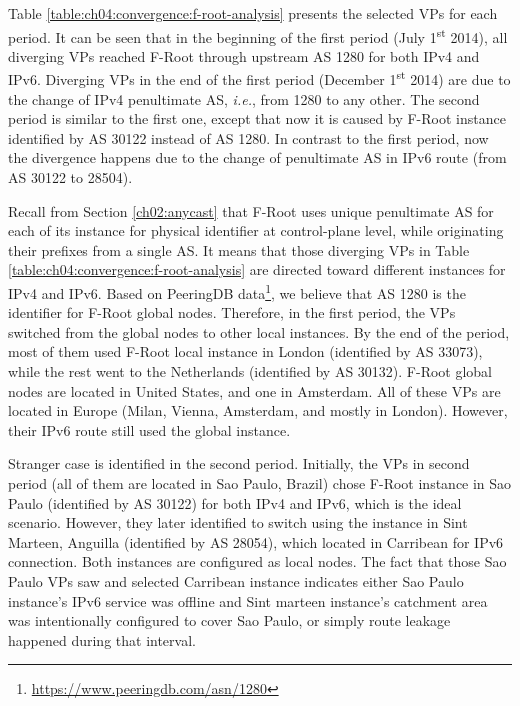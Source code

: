 Table \ref{table:ch04:convergence:f-root-analysis} presents the selected VPs for each period. It can be seen that in the beginning of the first period (July 1\textsuperscript{st} 2014), all diverging VPs reached F-Root through upstream AS 1280 for both IPv4 and IPv6. Diverging VPs in the end of the first period (December 1\textsuperscript{st} 2014) are due to the change of IPv4 penultimate AS, \textit{i.e.}, from 1280 to any other. The second period is similar to the first one, except that now it is caused by F-Root instance identified by AS 30122 instead of AS 1280. In contrast to the first period, now the divergence happens due to the change of penultimate AS in IPv6 route (from AS 30122 to 28504). 

Recall from Section \ref{ch02:anycast} that F-Root uses unique penultimate AS for each of its instance for physical identifier at control-plane level, while originating their prefixes from a single AS. It means that those diverging VPs in Table \ref{table:ch04:convergence:f-root-analysis} are directed toward different instances for IPv4 and IPv6. 
Based on PeeringDB data\footnote{\url{https://www.peeringdb.com/asn/1280}}, we believe that AS 1280 is the identifier for F-Root global nodes. Therefore, in the first period, the VPs switched from the global nodes to other local instances.  By the end of the period, most of them used F-Root local instance in London (identified by AS 33073), while the rest went to the Netherlands (identified by AS 30132). F-Root global nodes are located in United States, and one in Amsterdam. All of these VPs are located in Europe (Milan, Vienna, Amsterdam, and mostly in London). However, their IPv6 route still used the global instance. 

Stranger case is identified in the second period. Initially, the VPs in second period (all of them are located in Sao Paulo, Brazil) chose F-Root instance in Sao Paulo (identified by AS 30122) for both IPv4 and IPv6, which is the ideal scenario. However, they later identified to switch using the instance in Sint Marteen, Anguilla  (identified by AS 28054), which located in Carribean for IPv6 connection. Both instances are configured as local nodes. The fact that those Sao Paulo VPs saw and selected Carribean instance indicates either Sao Paulo instance's IPv6 service was offline and Sint marteen instance's catchment area was intentionally configured to cover Sao Paulo, or simply route leakage happened during that interval.

